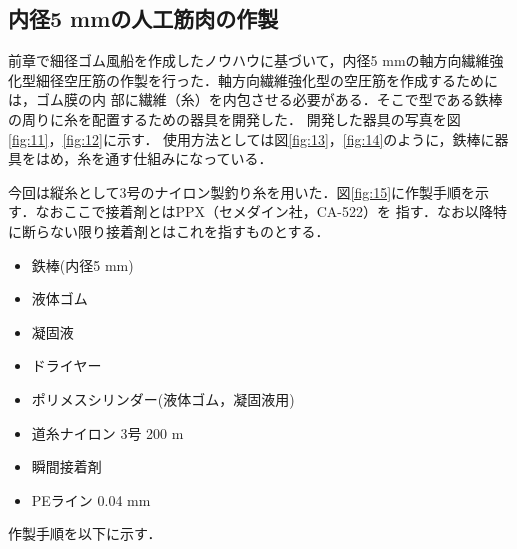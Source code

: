 \subsection{内径5 mmの人工筋肉の作製}
前章で細径ゴム風船を作成したノウハウに基づいて，内径5 mmの軸方向繊維強化型細径空圧筋の作製を行った．軸方向繊維強化型の空圧筋を作成するためには，ゴム膜の内
部に繊維（糸）を内包させる必要がある．そこで型である鉄棒の周りに糸を配置するための器具を開発した．
開発した器具の写真を図\ref{fig:11}，\ref{fig:12}に示す．
使用方法としては図\ref{fig:13}，\ref{fig:14}のように，鉄棒に器具をはめ，糸を通す仕組みになっている．

今回は縦糸として3号のナイロン製釣り糸を用いた．図\ref{fig:15}に作製手順を示す．なおここで接着剤とはPPX（セメダイン社，CA-522）を
指す．なお以降特に断らない限り接着剤とはこれを指すものとする．
\begin{itemize}
  \item 鉄棒(内径5 mm)
  \item 液体ゴム
  \item 凝固液
  \item ドライヤー
  \item ポリメスシリンダー(液体ゴム，凝固液用)
  \item 道糸ナイロン 3号 200 m
  \item 瞬間接着剤
  \item PEライン 0.04 mm
\end{itemize}
作製手順を以下に示す．
